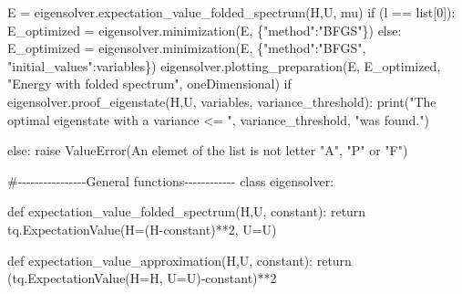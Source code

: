 \documentclass[
  letterpaper,
  DIV=11,
  numbers=noendperiod]{scrartcl}
\newenvironment{Shaded}{\begin{snugshade}}{\end{snugshade}}
\newcommand{\BuiltInTok}[1]{\textcolor[rgb]{0.00,0.23,0.31}{#1}}
\newcommand{\CommentTok}[1]{\textcolor[rgb]{0.37,0.37,0.37}{#1}}
\newcommand{\ControlFlowTok}[1]{\textcolor[rgb]{0.00,0.23,0.31}{#1}}
\newcommand{\DecValTok}[1]{\textcolor[rgb]{0.68,0.00,0.00}{#1}}
\newcommand{\KeywordTok}[1]{\textcolor[rgb]{0.00,0.23,0.31}{#1}}
\newcommand{\NormalTok}[1]{\textcolor[rgb]{0.00,0.23,0.31}{#1}}
\newcommand{\OperatorTok}[1]{\textcolor[rgb]{0.37,0.37,0.37}{#1}}
\newcommand{\PreprocessorTok}[1]{\textcolor[rgb]{0.68,0.00,0.00}{#1}}
\newcommand{\StringTok}[1]{\textcolor[rgb]{0.13,0.47,0.30}{#1}}
\begin{document}
\begin{Shaded}
\begin{Highlighting}[]
\NormalTok{                E }\OperatorTok{=}\NormalTok{ eigensolver.expectation\_value\_folded\_spectrum(H,U, mu)}
                \ControlFlowTok{if}\NormalTok{ (l }\OperatorTok{==} \BuiltInTok{list}\NormalTok{[}\DecValTok{0}\NormalTok{]):}
\NormalTok{                    E\_optimized }\OperatorTok{=}\NormalTok{ eigensolver.minimization(E, \{}\StringTok{"method"}\NormalTok{:}\StringTok{"BFGS"}\NormalTok{\})}
                \ControlFlowTok{else}\NormalTok{: }
\NormalTok{                    E\_optimized }\OperatorTok{=}\NormalTok{ eigensolver.minimization(E, \{}\StringTok{"method"}\NormalTok{:}\StringTok{"BFGS"}\NormalTok{, }\StringTok{"initial\_values"}\NormalTok{:variables\})}
\NormalTok{                eigensolver.plotting\_preparation(E, E\_optimized, }\StringTok{"Energy with folded spectrum"}\NormalTok{, oneDimensional)}
                \ControlFlowTok{if}\NormalTok{ eigensolver.proof\_eigenstate(H,U, variables, variance\_threshold):}
                        \BuiltInTok{print}\NormalTok{(}\StringTok{"The optimal eigenstate with a variance \textless{}= "}\NormalTok{, variance\_threshold, }\StringTok{"was found."}\NormalTok{)}
                
            \ControlFlowTok{else}\NormalTok{:}
                \ControlFlowTok{raise} \PreprocessorTok{ValueError}\NormalTok{(}\StringTok{\textquotesingle{}An elemet of the list is not letter "A", "P" or "F"\textquotesingle{}}\NormalTok{)}

\CommentTok{\#{-}{-}{-}{-}{-}{-}{-}{-}{-}{-}{-}{-}{-}{-}{-}{-}General functions{-}{-}{-}{-}{-}{-}{-}{-}{-}{-}{-}{-}}
\KeywordTok{class}\NormalTok{ eigensolver:}
    
    \KeywordTok{def}\NormalTok{ expectation\_value\_folded\_spectrum(H,U, constant):}
        \ControlFlowTok{return}\NormalTok{ tq.ExpectationValue(H}\OperatorTok{=}\NormalTok{(H}\OperatorTok{{-}}\NormalTok{constant)}\OperatorTok{**}\DecValTok{2}\NormalTok{, U}\OperatorTok{=}\NormalTok{U)}
    
    \KeywordTok{def}\NormalTok{ expectation\_value\_approximation(H,U, constant):}
        \ControlFlowTok{return}\NormalTok{ (tq.ExpectationValue(H}\OperatorTok{=}\NormalTok{H, U}\OperatorTok{=}\NormalTok{U)}\OperatorTok{{-}}\NormalTok{constant)}\OperatorTok{**}\DecValTok{2}
    

\end{Highlighting}
\end{Shaded}
\end{document}
